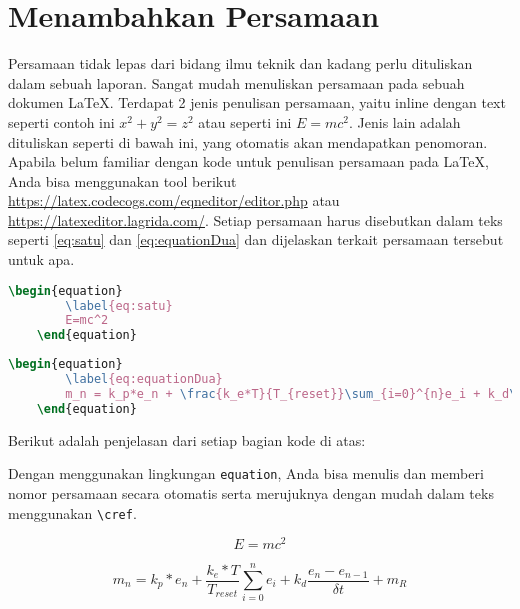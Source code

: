 \section{Menambahkan Persamaan}

Persamaan tidak lepas dari bidang ilmu teknik dan kadang perlu dituliskan dalam sebuah laporan. Sangat mudah menuliskan persamaan pada sebuah dokumen \LaTeX. Terdapat 2 jenis penulisan persamaan, yaitu inline dengan text seperti contoh ini \(x^2 + y^2 = z^2\) atau seperti ini $E=mc^2$. Jenis lain adalah dituliskan seperti di bawah ini, yang otomatis akan mendapatkan penomoran. Apabila belum familiar dengan kode untuk penulisan persamaan pada \LaTeX, Anda bisa menggunakan tool berikut \url{https://latex.codecogs.com/eqneditor/editor.php} atau \url{https://latexeditor.lagrida.com/}. Setiap persamaan harus disebutkan dalam teks seperti \cref{eq:satu} dan \cref{eq:equationDua} dan dijelaskan terkait persamaan tersebut untuk apa.

\begin{lstlisting}[language=TeX, caption=Kode untuk Menulis Persamaan, label=lst:kode_persamaan_emc]
    \begin{equation}
        \label{eq:satu}
        E=mc^2
    \end{equation}
\end{lstlisting}

\begin{lstlisting}[language=TeX, caption=Kode untuk Menulis Persamaan, label=lst:kode_persamaan_mn]
    \begin{equation}
        \label{eq:equationDua}
        m_n = k_p*e_n + \frac{k_e*T}{T_{reset}}\sum_{i=0}^{n}e_i + k_d\frac{e_n - e_{n-1}}{\delta t} + m_{R}
    \end{equation}
\end{lstlisting}

\noindent Berikut adalah penjelasan dari setiap bagian kode di atas:

Dengan menggunakan lingkungan \texttt{equation}, Anda bisa menulis dan memberi nomor persamaan secara otomatis serta merujuknya dengan mudah dalam teks menggunakan \texttt{\textbackslash cref}.

\begin{equation}
    \label{eq:satu}
    E=mc^2
\end{equation}

\begin{equation}
    \label{eq:equationDua}
    m_n = k_p*e_n + \frac{k_e*T}{T_{reset}}\sum_{i=0}^{n}e_i + k_d\frac{e_n - e_{n-1}}{\delta t} + m_{R}
\end{equation}

